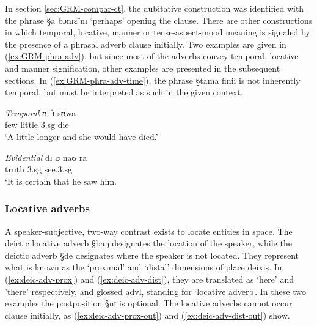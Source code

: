 In section \ref{sec:GRM-compar-ct}, the dubitative construction was identified 
with the phrase {\S a bɔnɪɛ̃ nɪ} `perhaps'  opening the clause. There are other
constructions in which temporal, locative, manner or tense-aspect-mood meaning 
is signaled by the presence of a phrasal adverb clause initially. Two examples
are given in (\ref{ex:GRM-phra-adv}),  but since most of the adverbs convey
temporal, locative and manner signification, other examples are presented in
the subsequent sections. In (\ref{ex:GRM-phra-adv-time}), the phrase {\S tama
finii} is not inherently temporal, but must be interpreted as such in the given
context. 


\begin{exe}
\ex\label{ex:GRM-phra-adv}
\begin{xlist}

\ex\label{ex:GRM-phra-adv-time}{\it Temporal}
 ʊ fɪ sʊwa\\
few little {\sc 3.sg} {\mod} die\\
\glt `A little longer and she would  have died.'


\ex\label{ex:GRM-phra-adv-}{\it Evidential}
\gll [wɪdɪɪŋ na] dɪ ʊ naʊ ra\\
truth {\foc} {\comp} {\sc 3.sg} see.{\sc 3.sg} {\foc} \\
\glt  `It is certain that he saw him.


\end{xlist}
\end{exe}

\subsubsection{Locative adverbs}
\label{sec:GRM-deic-adv}


A speaker-subjective,  two-way contrast  exists to locate entities in space. The
deictic locative adverb {\S baŋ} designates the location of the speaker, while 
the deictic adverb {\S de} designates  where the
speaker is not located. They represent what is known as the `proximal' and
`distal' 
dimensions of  place deixis. In (\ref{ex:deic-adv-prox}) and
(\ref{ex:deic-adv-dist}),  they are translated as `here' and 'there'
respectively, and glossed {\sc advl}, standing for `locative adverb'. In these
two examples  the postposition {\S nɪ} is optional.  The locative
adverbs cannot occur clause initially, as  (\ref{ex:deic-adv-prox-out})  and
  (\ref{ex:deic-adv-dist-out}) show. 



